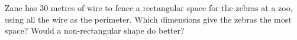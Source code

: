 Zane has $30$ metres of wire to fence a rectangular space for the zebras at a zoo, using all the wire as the perimeter. Which dimensions give the zebras the most space? Would a non-rectangular shape do better?

